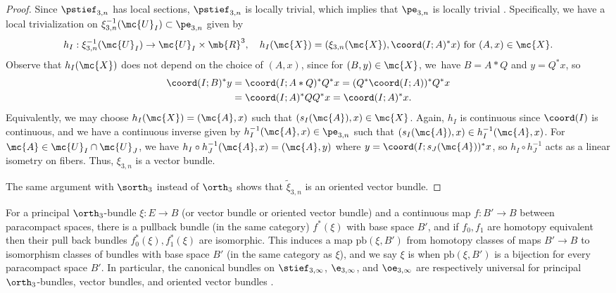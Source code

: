 \begin{proof}
Since $\pstief_{3,n}$ has local sections, $\pstief_{3,n}$ is locally trivial, which implies that $\pe_{3,n}$ is locally trivial \cite[\S 4.7]{husemoller1994fibre}.
Specifically, we have a local trivialization on $\xi_{3,n}^{-1}(\mc{U}_I) \subset \pe_{3,n}$ given by
\[ h_I : \xi_{3,n}^{-1}(\mc{U}_I) \to \mc{U}_I \times \mb{R}^3, \quad h_I(\mc{X}) = (\xi_{3,n}(\mc{X}),\coord(I;A)^*x) \text{ for } (A,x) \in \mc{X}. \]
Observe that $h_I(\mc{X})$ does not depend on the choice of $(A,x)$, since for $(B,y) \in \mc{X}$, we~have $B = A*Q$ and $y = Q^* x$, so
\begin{align*}
\coord(I;B)^*y &= \coord(I;A*Q)^*Q^*x = (Q^*\coord(I;A))^*Q^*x\\
&= \coord(I;A)^*QQ^*x = \coord(I;A)^*x.
\end{align*}
Equivalently, we may choose $h_I(\mc{X})=(\mc{A},x)$ such that $(s_I(\mc{A}),x) \in \mc{X}$. Again, $h_I$ is continuous since $\coord(I)$ is continuous, and we have a continuous inverse given by
$h_I^{-1}(\mc{A},x) \in \pe_{3,n}$ such that $(s_I(\mc{A}),x) \in h_I^{-1}(\mc{A},x)$.
For $\mc{A} \in \mc{U}_I \cap \mc{U}_J$, we have $h_I \circ h_J^{-1}(\mc{A},x) = (\mc{A},y)$ where $y = \coord(I;s_J(\mc{A}))^*x$, so $h_I \circ h_J^{-1}$ acts as a linear isometry on fibers.
Thus, $\xi_{3,n}$ is a vector bundle.

The same argument with $\sorth_3$ instead of $\orth_3$ shows that $\widetilde\xi_{3,n}$ is an oriented vector bundle.
\end{proof}

For a principal $\orth_3$-bundle $\xi: E \to B$ (or vector bundle or oriented vector bundle) and a continuous map $f: B' \to B$ between paracompact spaces, there is a pullback bundle (in the same category) $f^*(\xi)$ with base space $B'$, and if $f_0,f_1$ are homotopy equivalent then their pull back bundles $f_0^*(\xi),f_1^*(\xi)$ are isomorphic.
This induces a map $\text{pb}(\xi,B')$ from homotopy classes of maps $B' \to B$ to isomorphism classes of bundles with base space $B'$ (in the same category as $\xi$), and we say $\xi$ is  when $\text{pb}(\xi,B')$ is a bijection for every paracompact space $B'$.
In particular, the canonical bundles on $\stief_{3,\infty}$, $\e_{3,\infty}$, and $\oe_{3,\infty}$ are respectively universal for principal $\orth_3$-bundles, vector bundles, and oriented vector bundles \cite{husemoller1994fibre}.

